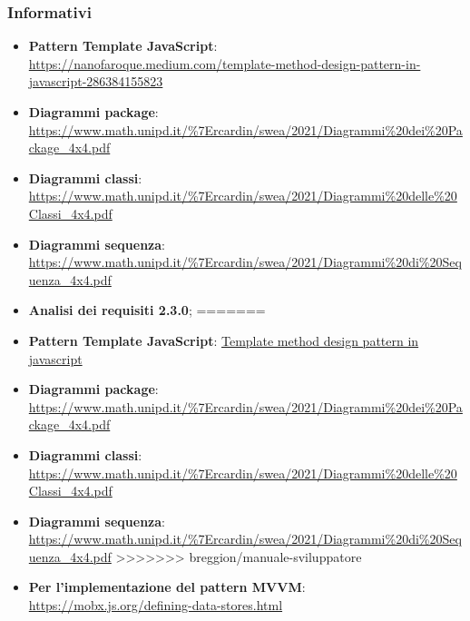     \subsubsection{Informativi}
	\begin{itemize}
<<<<<<< HEAD
		\item \textbf{Pattern Template JavaScript}:  \href{https://nanofaroque.medium.com/template-method-design-pattern-in-javascript-286384155823}{https://nanofaroque.medium.com/template-method-design-pattern-in-javascript-286384155823}
		\item \textbf{Diagrammi package}: \\ \url{https://www.math.unipd.it/\%7Ercardin/swea/2021/Diagrammi\%20dei\%20Package_4x4.pdf}
		\item \textbf{Diagrammi classi}: \\ \url{https://www.math.unipd.it/\%7Ercardin/swea/2021/Diagrammi\%20delle\%20Classi_4x4.pdf}
		\item \textbf{Diagrammi sequenza}: \\ \url{https://www.math.unipd.it/\%7Ercardin/swea/2021/Diagrammi\%20di\%20Sequenza_4x4.pdf}
		\item \textbf{Analisi dei requisiti 2.3.0};
=======
		\item \textbf{Pattern Template JavaScript}:  \href{https://bit.ly/32yUACL}{Template method design pattern in javascript}
		\item \textbf{Diagrammi package}: \\ \url{https://www.math.unipd.it/\%7Ercardin/swea/2021/Diagrammi\%20dei\%20Package_4x4.pdf}
		\item \textbf{Diagrammi classi}: \\ \url{https://www.math.unipd.it/\%7Ercardin/swea/2021/Diagrammi\%20delle\%20Classi_4x4.pdf}
		\item \textbf{Diagrammi sequenza}: \\ \url{https://www.math.unipd.it/\%7Ercardin/swea/2021/Diagrammi\%20di\%20Sequenza_4x4.pdf}
>>>>>>> breggion/manuale-sviluppatore
		\item \textbf{Per l'implementazione del pattern MVVM}: \url{https://mobx.js.org/defining-data-stores.html}
	\end{itemize}
